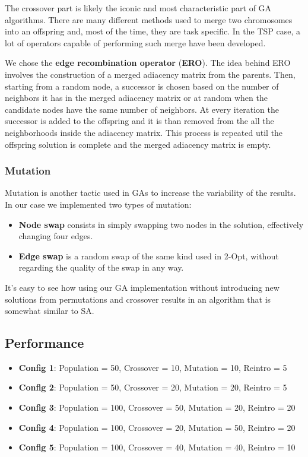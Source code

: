 The crossover part is likely the iconic and most characteristic part of GA algorithms.
There are many different methods used to merge two chromosomes into an offspring and, most of the time, they are task specific.
In the TSP case, a lot of operators capable of performing such merge have been developed.

We chose the \textbf{edge recombination operator} (\textbf{ERO}).
The idea behind ERO involves the construction of a merged adiacency matrix from the parents.
Then, starting from a random node, a successor is chosen based on the number of neighbors it has in the merged adiacency matrix or at random when the candidate nodes have the same number of neighbors.
At every iteration the successor is added to the offspring and it is than removed from the all the neighborhoods inside the adiacency matrix.
This process is repeated util the offspring solution is complete and the merged adiacency matrix is empty.

\subsubsection{Mutation}

Mutation is another tactic used in GAs to increase the variability of the results.
In our case we implemented two types of mutation:
\begin{itemize}
    \item \textbf{Node swap} consists in simply swapping two nodes in the solution, effectively changing four edges.
    \item \textbf{Edge swap} is a random swap of the same kind used in 2-Opt, without regarding the quality of the swap in any way.
\end{itemize}

It's easy to see how using our GA implementation without introducing new solutions from permutations and crossover results in an algorithm that is somewhat similar to SA.

\subsection{Performance}

\begin{itemize}
    \item \textbf{Config 1}: Population = 50, Crossover = 10, Mutation = 10, Reintro =  5
    \item \textbf{Config 2}: Population = 50, Crossover = 20, Mutation = 20, Reintro =  5
    \item \textbf{Config 3}: Population = 100, Crossover = 50, Mutation = 20, Reintro = 20
    \item \textbf{Config 4}: Population = 100, Crossover = 20, Mutation = 50, Reintro = 20
    \item \textbf{Config 5}: Population = 100, Crossover = 40, Mutation = 40, Reintro = 10
\end{itemize}

